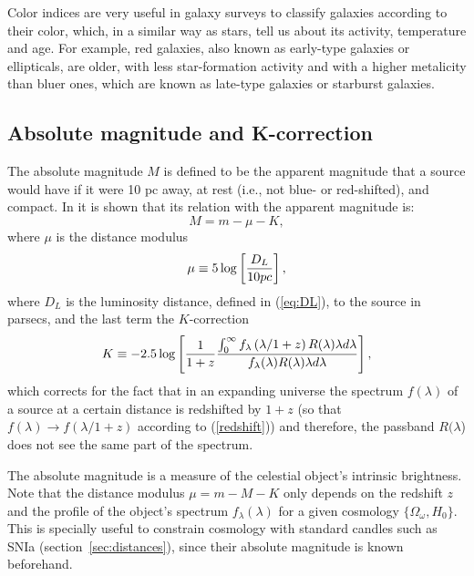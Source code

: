 Color indices are very useful in galaxy surveys to classify galaxies according to their color, which, in a similar way as stars, tell us about its activity, temperature and age. For example, red galaxies, also known as early-type galaxies or ellipticals, are older, with less star-formation activity and with a higher metalicity than bluer ones, which are known as late-type galaxies or starburst galaxies.

\subsection{Absolute magnitude and K-correction}
\label{sec:absolute_mag}
The absolute magnitude $M$ is defined to be the apparent magnitude that a source would have if it were 10 pc away, at rest (i.e., not blue- or red-shifted), and compact. In \citet{Hogg1996} it is shown that its relation with the apparent magnitude is:
\begin{equation}
M = m - \mu - K,
\end{equation}
where $\mu$ is the distance modulus 
\begin{equation}
\mu \equiv 5 \log \left[{D_L \over 10pc} \right],
\end{equation}
where $D_L$ is the luminosity distance, defined in (\ref{eq:DL}), to the source in parsecs, and the last term the $K$-correction 
\begin{equation}
K \equiv -2.5 \log \left[{1 \over 1+z}{\int^{\infty}_{0} f_\lambda \left( \lambda / 1+z \right)R(\lambda)\lambda d\lambda \over f_\lambda(\lambda)R(\lambda)\lambda d\lambda}\right], 
\end{equation}
which corrects for the fact that in an expanding universe the spectrum $f(\lambda)$ of a source at a certain distance is redshifted by $1+z$ (so that $f(\lambda) \rightarrow f(\lambda/1+z)$ according to (\ref{redshift})) and therefore, the passband $R(\lambda$) does not see the same part of the spectrum.

The absolute magnitude is a measure of the celestial object's intrinsic brightness. Note that the distance modulus $\mu = m - M - K$ only depends on the redshift $z$ and the profile of the object's spectrum $f_\lambda(\lambda)$ for a given cosmology $\lbrace \Omega_\omega, H_0 \rbrace$. This is specially useful to constrain cosmology with standard candles such as SNIa (section~\ref{sec:distances}), since their absolute magnitude is known beforehand.

